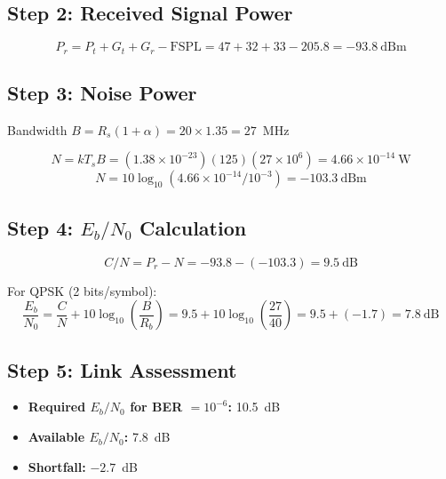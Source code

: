 \subsection*{Step 2: Received Signal Power}

\begin{equation}
P_r = P_t + G_t + G_r - \mathrm{FSPL} = 47 + 32 + 33 - 205.8 = -93.8~\text{dBm}
\end{equation}

\subsection*{Step 3: Noise Power}

Bandwidth $B = R_s(1 + \alpha) = 20 \times 1.35 = 27$~MHz

\begin{equation}
N = kT_sB = (1.38 \times 10^{-23})(125)(27 \times 10^6) = 4.66 \times 10^{-14}~\text{W}
\end{equation}
\begin{equation}
N = 10\log_{10}(4.66 \times 10^{-14} / 10^{-3}) = -103.3~\text{dBm}
\end{equation}

\subsection*{Step 4: $E_b/N_0$ Calculation}

\begin{equation}
C/N = P_r - N = -93.8 - (-103.3) = 9.5~\text{dB}
\end{equation}

For QPSK (2 bits/symbol):
\begin{equation}
\frac{E_b}{N_0} = \frac{C}{N} + 10\log_{10}\left(\frac{B}{R_b}\right) = 9.5 + 10\log_{10}\left(\frac{27}{40}\right) = 9.5 + (-1.7) = 7.8~\text{dB}
\end{equation}

\subsection*{Step 5: Link Assessment}

\begin{itemize}
\item \textbf{Required $E_b/N_0$ for BER $= 10^{-6}$:} 10.5~dB
\item \textbf{Available $E_b/N_0$:} 7.8~dB
\item \textbf{Shortfall:} $-2.7$~dB
\end{itemize}

